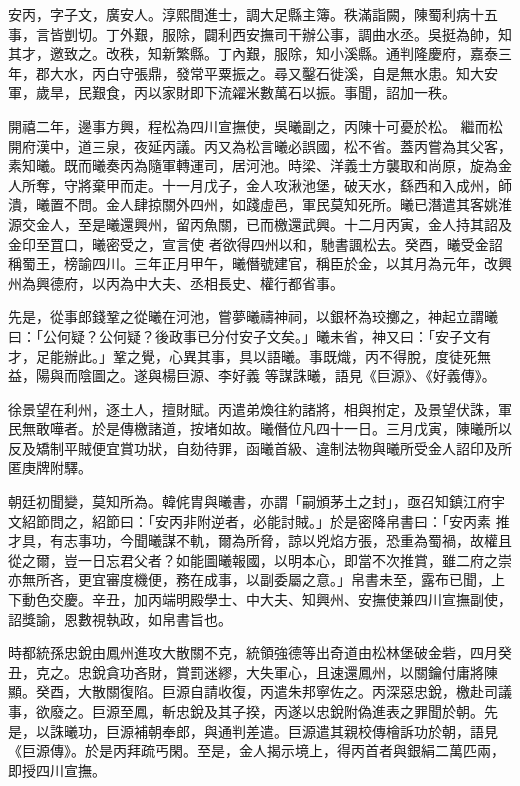 \begin{pinyinscope}
 安丙，字子文，廣安人。淳熙間進士，調大足縣主簿。秩滿詣闕，陳蜀利病十五事，言皆剴切。丁外艱，服除，闢利西安撫司干辦公事，調曲水丞。吳挺為帥，知其才，邀致之。改秩，知新繁縣。丁內艱，服除，知小溪縣。通判隆慶府，嘉泰三年，郡大水，丙白守張鼎，發常平粟振之。尋又鑿石徙溪，自是無水患。知大安軍，歲旱，民艱食，丙以家財即下流糴米數萬石以振。事聞，詔加一秩。



 開禧二年，邊事方興，程松為四川宣撫使，吳曦副之，丙陳十可憂於松。
 繼而松開府漢中，道三泉，夜延丙議。丙又為松言曦必誤國，松不省。蓋丙嘗為其父客，素知曦。既而曦奏丙為隨軍轉運司，居河池。時梁、洋義士方襲取和尚原，旋為金人所奪，守將棄甲而走。十一月戊子，金人攻湫池堡，破天水，繇西和入成州，師潰，曦置不問。金人肆掠關外四州，如踐虛邑，軍民莫知死所。曦已潛遣其客姚淮源交金人，至是曦還興州，留丙魚關，已而檄還武興。十二月丙寅，金人持其詔及金印至罝口，曦密受之，宣言使
 者欲得四州以和，馳書諷松去。癸酉，曦受金詔稱蜀王，榜諭四川。三年正月甲午，曦僭號建官，稱臣於金，以其月為元年，改興州為興德府，以丙為中大夫、丞相長史、權行都省事。



 先是，從事郎錢鞏之從曦在河池，嘗夢曦禱神祠，以銀杯為珓擲之，神起立謂曦曰：「公何疑？公何疑？後政事已分付安子文矣。」曦未省，神又曰：「安子文有才，足能辦此。」鞏之覺，心異其事，具以語曦。事既熾，丙不得脫，度徒死無益，陽與而陰圖之。遂與楊巨源、李好義
 等謀誅曦，語見《巨源》、《好義傳》。



 徐景望在利州，逐土人，擅財賦。丙遣弟煥往約諸將，相與拊定，及景望伏誅，軍民無敢嘩者。於是傳檄諸道，按堵如故。曦僭位凡四十一日。三月戊寅，陳曦所以反及矯制平賊便宜賞功狀，自劾待罪，函曦首級、違制法物與曦所受金人詔印及所匿庚牌附驛。



 朝廷初聞變，莫知所為。韓侂胄與曦書，亦謂「嗣頒茅土之封」，亟召知鎮江府宇文紹節問之，紹節曰：「安丙非附逆者，必能討賊。」於是密降帛書曰：「安丙素
 推才具，有志事功，今聞曦謀不軌，爾為所脅，諒以兇焰方張，恐重為蜀禍，故權且從之爾，豈一日忘君父者？如能圖曦報國，以明本心，即當不次推賞，雖二府之崇亦無所吝，更宜審度機便，務在成事，以副委屬之意。」帛書未至，露布已聞，上下動色交慶。辛丑，加丙端明殿學士、中大夫、知興州、安撫使兼四川宣撫副使，詔獎諭，恩數視執政，如帛書旨也。



 時都統孫忠銳由鳳州進攻大散關不克，統領強德等出奇道由松林堡破金砦，四月癸
 丑，克之。忠銳貪功吝財，賞罰迷繆，大失軍心，且速還鳳州，以關鑰付庸將陳顯。癸酉，大散關復陷。巨源自請收復，丙遣朱邦寧佐之。丙深惡忠銳，檄赴司議事，欲廢之。巨源至鳳，斬忠銳及其子揆，丙遂以忠銳附偽進表之罪聞於朝。先是，以誅曦功，巨源補朝奉郎，與通判差遣。巨源遣其親校傳檜訴功於朝，語見《巨源傳》。於是丙拜疏丐閑。至是，金人揭示境上，得丙首者與銀絹二萬匹兩，即授四川宣撫。




\end{pinyinscope}
